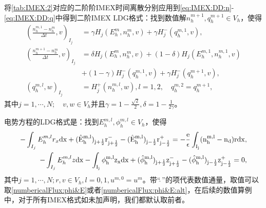 将\autoref{tab:IMEX:2}对应的二阶阶IMEX时间离散分别应用到\eqref{eq:IMEX:DD:n}-\eqref{eq:IMEX:DD:q}中得到二阶IMEX LDG格式：找到数值解$n_h^{m+1},q_h^{m+1}\in V_h$，使得
\begin{align}
    (\frac{n_h^{m,1} -n_h^m}{\Delta t},v)_{I_j} & = \gamma H_j(E_h^m,n_h^m,v) + \gamma H_j^-(q_h^{m,1},v),              \label{eq:IMEX:2:first} \\
    (\frac{n_h^{m+1} -n_h^m}{\Delta t},v)_{I_j} & = \delta H_j(E_h^m,n_h^m,v) + (1-\delta)H_j(E_h^{m,1},n_h^{m,1},v) \nonumber                  \\
                                                & +(1-\gamma)H_j^-(q_h^{m,1},v) + \gamma H_j^-(q_h^{m+1},v),                                    \\
    (q_h^{m,l},w)_{I_j}                         & = H_j^+(n_h^{m,l},w), l = 1,2, \quad q_h^{m,2} = q_h^{m+1},
\end{align}
其中$j = 1,\cdots,N;\quad v,w \in V_h$并且$\gamma = 1- \frac{\sqrt{2}}{2},\delta = 1 - \frac{1}{2\gamma}$。

电势方程的LDG格式是：找到$E_h^{m,l},\phi_h^{m,l} \in V_h$，使得
\begin{align}
    -\int_{I_j} E_h^{m,l}r_x \rm{d}x + (\hat{E}_h^{m,l})_{j+\frac{1}{2}}r_{j+\frac{1}{2}}^- - (\hat{E}_h^{m,l})_{j-\frac{1}{2}}r_{j-\frac{1}{2}}^+ = -\frac{e}{\epsilon}\int_{I_j}(n_h^{m,l} - n_d) r\rm{d} x, \\
    -\int_{I_j} E_h^{m,l}z \rm{d}x - \int_{I_j} \phi_h^{m,l}z_x \rm{d}x  + (\hat{\phi}_h^{m,l})_{j+\frac{1}{2}}z^-_{j+\frac{1}{2}} - (\hat{\phi}_h^{m,l})_{j-\frac{1}{2}}z_{j-\frac{1}{2}}^+  = 0, \label{eq:IMEX:2:last}
\end{align}
其中$j = 1,\cdots,N; r,v \in V_h, l = 0,1, u^{m,0} = u^m$。带“$\widehat{\ }$”的项代表数值通量，取值可以取\eqref{numbericalFlux:phi&E}或者\eqref{numbericalFlux:phi&E:alt}，在后续的数值算例中，对于所有IMEX格式如未加声明，我们都默认取前者。

